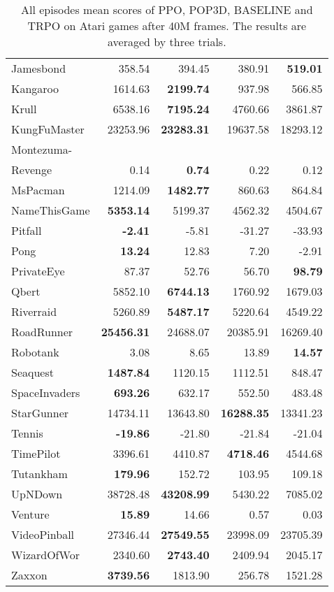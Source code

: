 \documentclass{article}
\begin{document}
\begin{table*}
\begin{center}
\begin{tabular}{lrrrr}
			Jamesbond & 358.54& 394.45& 380.91&\textbf{519.01}\\
			Kangaroo & 1614.63&\textbf{2199.74}& 937.98& 566.85\\
			Krull  & 6538.16&\textbf{7195.24}& 4760.66& 3861.87\\
			KungFuMaster & 23253.96&\textbf{23283.31}& 19637.58& 18293.12\\
			Montezuma-\\
			Revenge  & 0.14&\textbf{0.74}& 0.22& 0.12\\
			MsPacman & 1214.09&\textbf{1482.77}& 860.63& 864.84\\
			NameThisGame &\textbf{5353.14}& 5199.37& 4562.32& 4504.67\\
			Pitfall &\textbf{-2.41}& -5.81& -31.27& -33.93\\
			Pong  &\textbf{13.24}& 12.83& 7.20& -2.91\\
			PrivateEye  & 87.37& 52.76& 56.70&\textbf{98.79}\\
			Qbert & 5852.10&\textbf{6744.13}& 1760.92& 1679.03\\
			Riverraid & 5260.89&\textbf{5487.17}& 5220.64& 4549.22\\
			RoadRunner &\textbf{25456.31}& 24688.07& 20385.91& 16269.40\\
			Robotank & 3.08& 8.65& 13.89&\textbf{14.57}\\
			Seaquest &\textbf{1487.84}& 1120.15& 1112.51& 848.47\\
			SpaceInvaders &\textbf{693.26}& 632.17& 552.50& 483.48\\
			StarGunner & 14734.11& 13643.80&\textbf{16288.35}& 13341.23\\
			Tennis &\textbf{-19.86}& -21.80& -21.84& -21.04\\
			TimePilot& 3396.61& 4410.87&\textbf{4718.46}& 4544.68\\
			Tutankham &\textbf{179.96}& 152.72& 103.95& 109.18\\
			UpNDown & 38728.48&\textbf{43208.99}& 5430.22& 7085.02\\
			Venture &\textbf{15.89}& 14.66& 0.57& 0.03\\
			VideoPinball & 27346.44&\textbf{27549.55}& 23998.09& 23705.39\\
			WizardOfWor  & 2340.60&\textbf{2743.40}& 2409.94& 2045.17\\
			Zaxxon  &\textbf{3739.56}& 1813.90& 256.78& 1521.28\\
			\bottomrule
		\end{tabular}
	\end{center}
	\caption{All episodes mean scores of PPO, POP3D, BASELINE and TRPO on Atari games after 40M frames. The results are averaged by three trials.}
	\label{all-episodes-score}
	
\end{table*}
\end{document}
